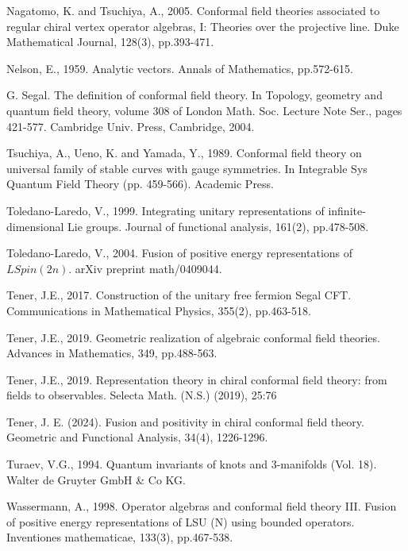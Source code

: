 \documentclass[11pt,b5paper,notitlepage]{article}
\theoremstyle{definition}
\theoremstyle{plain}
\numberwithin{equation}{subsection}
\begin{document}
\begin{thebibliography}{999999}
Nagatomo, K. and Tsuchiya, A., 2005. Conformal field theories associated to regular chiral vertex operator algebras, I: Theories over the projective line. Duke Mathematical Journal, 128(3), pp.393-471.


Nelson, E., 1959. Analytic vectors. Annals of Mathematics, pp.572-615.

G. Segal. The definition of conformal field theory. In Topology, geometry and quantum field theory, volume 308 of London Math. Soc. Lecture Note Ser., pages 421-577. Cambridge Univ. Press, Cambridge, 2004.

Tsuchiya, A., Ueno, K. and Yamada, Y., 1989. Conformal field theory on universal family of stable curves with gauge symmetries. In Integrable Sys Quantum Field Theory (pp. 459-566). Academic Press.

Toledano-Laredo, V., 1999. Integrating unitary representations of infinite-dimensional Lie groups. Journal of functional analysis, 161(2), pp.478-508.

Toledano-Laredo, V., 2004. Fusion of positive energy representations of $LSpin(2n)$. arXiv preprint math/0409044.

Tener, J.E., 2017. Construction of the unitary free fermion Segal CFT. Communications in Mathematical Physics, 355(2), pp.463-518.



Tener, J.E., 2019. Geometric realization of algebraic conformal field theories. Advances in Mathematics, 349, pp.488-563.


Tener, J.E., 2019. Representation theory in chiral conformal field theory: from fields to
observables. Selecta Math. (N.S.) (2019), 25:76

Tener, J. E. (2024). Fusion and positivity in chiral conformal field theory. Geometric and Functional Analysis, 34(4), 1226-1296.



Turaev, V.G., 1994. Quantum invariants of knots and 3-manifolds (Vol. 18). Walter de Gruyter GmbH \& Co KG.

Wassermann, A., 1998. Operator algebras and conformal field theory III. Fusion of positive energy representations of LSU (N) using bounded operators. Inventiones mathematicae, 133(3), pp.467-538.


\end{thebibliography}
\end{document}
